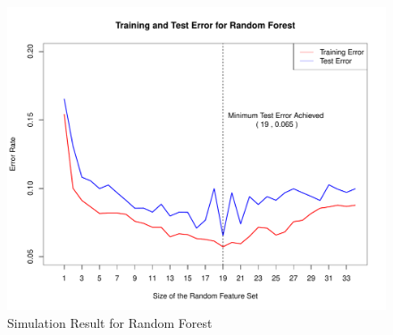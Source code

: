 \documentclass[12pt,oneside,a4paper]{article}
\begin{document}
\begin{figure}[ht!]
    \centering
    \includegraphics[width=1\textwidth]{./figure/rf.pdf}
    \caption{Simulation Result for Random Forest}
    \label{fig:rf}
\end{figure}
\end{document}
